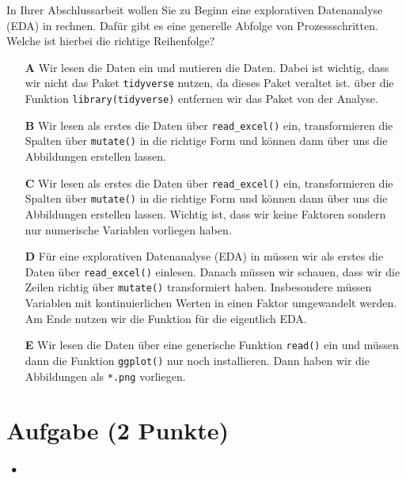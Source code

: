 \documentclass[a4paper, 9pt]{scrartcl}\usepackage[]{graphicx}\usepackage[]{xcolor}
\begin{document}
In Ihrer Abschlussarbeit wollen Sie zu Beginn eine explorativen Datenanalyse (EDA) in \Rlogo rechnen. Dafür gibt es eine generelle Abfolge von Prozessschritten. Welche ist hierbei die richtige Reihenfolge?



\begin{enumerate}
\item [\textbf{A} \msquare] Wir lesen die Daten ein und mutieren die Daten. Dabei ist wichtig, dass wir nicht das Paket \texttt{tidyverse} nutzen, da dieses Paket veraltet ist. über die Funktion \texttt{library(tidyverse)} entfernen wir das Paket von der Analyse.
\item [\textbf{B} \msquare] Wir lesen als erstes die Daten über \texttt{read\_excel()} ein, transformieren die Spalten über \texttt{mutate()} in die richtige Form und können dann über  uns die Abbildungen erstellen lassen.
\item [\textbf{C} \msquare] Wir lesen als erstes die Daten über \texttt{read\_excel()} ein, transformieren die Spalten über \texttt{mutate()} in die richtige Form und können dann  über  uns die Abbildungen erstellen lassen. Wichtig ist, dass wir keine Faktoren sondern nur numerische Variablen vorliegen haben.
\item [\textbf{D} \msquare] Für eine explorativen Datenanalyse (EDA) in \Rlogo müssen wir als erstes die Daten über \texttt{read\_excel()} einlesen. Danach müssen wir schauen, dass wir die Zeilen richtig über \texttt{mutate()} transformiert haben. Insbesondere müssen Variablen mit kontinuierlichen Werten in einen Faktor umgewandelt werden. Am Ende nutzen wir die Funktion  für die eigentlich EDA.
\item [\textbf{E} \msquare] Wir lesen die Daten über eine generische Funktion \texttt{read()} ein und müssen dann die Funktion \texttt{ggplot()} nur noch installieren. Dann haben wir die Abbildungen als \texttt{*.png} vorliegen.
\end{enumerate} 

\section{Aufgabe \hfill (2 Punkte)}

\ifcollection
\begin{flushright}
\tiny\vspace{-2Ex}
\textbf{\examinhaltstart}
\exammodulestatversuch $\;\bullet$
\exammodulebiostat
\vspace{-1Ex}
\end{flushright}
\fi
\end{document}
